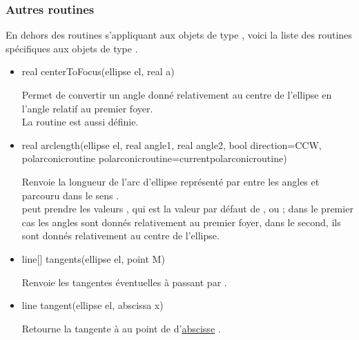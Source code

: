 \documentclass[pdftex]{article}
\begin{document}
\subsubsection{Autres routines}
En dehors des routines s'appliquant aux objets de type ,
voici la liste des routines spécifiques aux objets de type
.
\begin{itemize}
\item {}
  \begin{Vcolor}
    real centerToFocus(ellipse el, real a)
  \end{Vcolor}
  Permet de convertir un angle donné relativement au centre de
  l'ellipse en l'angle relatif au premier foyer.\\
  La routine  est aussi définie.
\item {}
  \begin{Vcolor}
    real arclength(ellipse el, real angle1, real angle2,
    bool direction=CCW,
    polarconicroutine polarconicroutine=currentpolarconicroutine)
  \end{Vcolor}
  Renvoie la longueur de l'arc d'ellipse représenté par 
  entre les angles  et  parcouru dans le
  sens .\\
   peut prendre les
  valeurs , qui est la valeur par défaut de\linebreak
  , ou
  ; dans le premier cas les
  angles sont donnés relativement au premier foyer, dans le
  second, ils sont donnés relativement au centre de l'ellipse.
\item {}
  \begin{Vcolor}
    line[] tangents(ellipse el, point M)
  \end{Vcolor}
  Renvoie les tangentes éventuelles à  passant
  par .
\item {}
  \begin{Vcolor}
    line tangent(ellipse el, abscissa x)
  \end{Vcolor}
  Retourne la tangente à  au point de 
  d'\href{#section.abscissa}{abscisse} .


\end{itemize}
\end{document}
